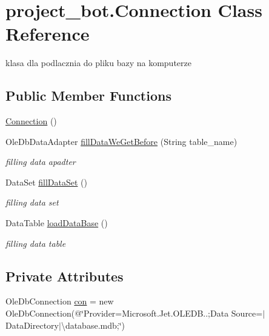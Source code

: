 \hypertarget{classproject__bot_1_1_connection}{}\section{project\+\_\+bot.\+Connection Class Reference}
\label{classproject__bot_1_1_connection}


klasa dla podlacznia do pliku bazy na komputerze  


\subsection*{Public Member Functions}
\begin{DoxyCompactItemize}
\item 
\hyperlink{classproject__bot_1_1_connection_afbc2c2e2977a5f98d1d51d919fd9314e}{Connection} ()
\item 
Ole\+Db\+Data\+Adapter \hyperlink{classproject__bot_1_1_connection_a67557fe025a012e4ab1ad9bb949cb9c0}{fill\+Data\+We\+Get\+Before} (String table\+\_\+name)
\begin{DoxyCompactList}\small\item\em filling data apadter \end{DoxyCompactList}\item 
Data\+Set \hyperlink{classproject__bot_1_1_connection_af68118c08e33fec46caeb1c4b904d588}{fill\+Data\+Set} ()
\begin{DoxyCompactList}\small\item\em filling data set \end{DoxyCompactList}\item 
Data\+Table \hyperlink{classproject__bot_1_1_connection_a03f99178a79b05fef2f3a429a0a04df4}{load\+Data\+Base} ()
\begin{DoxyCompactList}\small\item\em filling data table \end{DoxyCompactList}\end{DoxyCompactItemize}
\subsection*{Private Attributes}
\begin{DoxyCompactItemize}
\item 
Ole\+Db\+Connection \hyperlink{classproject__bot_1_1_connection_a4cb9b8b0a35c7f47792fa864d3fcff24}{con} = new Ole\+Db\+Connection(@\char`\"{}Provider=Microsoft.\+Jet.\+O\+L\+E\+D\+B..;Data Source=$\vert$Data\+Directory$\vert$\textbackslash{}database.\+mdb;\char`\"{})
\end{DoxyCompactItemize}


